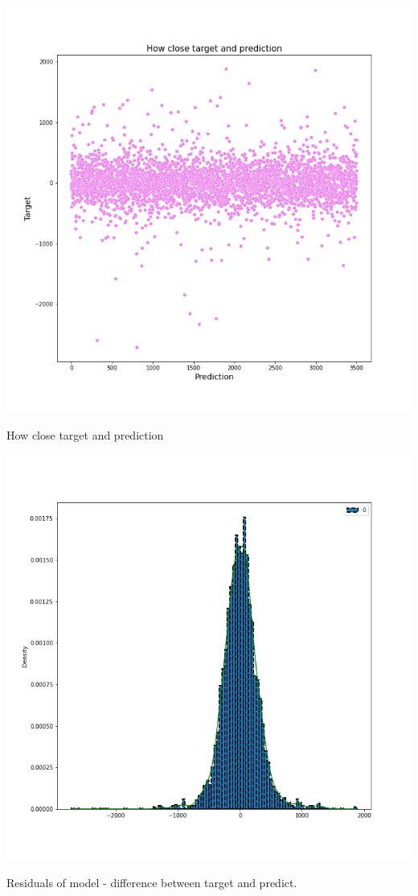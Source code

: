 \documentclass[%
12pt, %
final, %
oneside, %
onecolumn, %
centertags]{article} %
\theoremstyle{plain}
\theoremstyle{definition}
\theoremstyle{remark}
\begin{document}
\begin{center}
\includegraphics[scale=0.7]{images/target_predict.png}

How close target and prediction
\end{center}

\begin{center}
\includegraphics[scale=0.55]{images/residuals.png}

Residuals of model - difference between target and predict.
\end{center}
\end{document}
